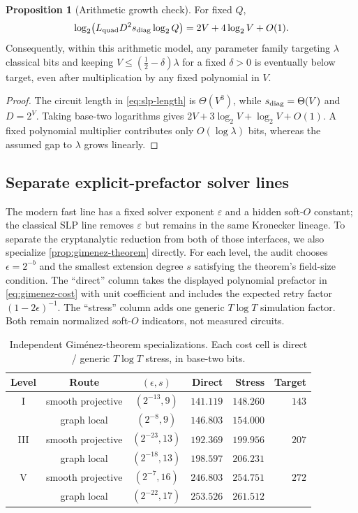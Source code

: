\documentclass[11pt,a4paper]{article}
\theoremstyle{definition}
\newtheorem{proposition}[theorem]{Proposition}
\theoremstyle{remark}
\begin{document}
\begin{proposition}[Arithmetic growth check]\label{prop:slp-growth}
For fixed $Q$,
\[
 \log_2\!\left(L_{\rm quad}D^2s_{\rm diag}\log_2Q\right)
 =2V+4\log_2V+O(1).
\]
Consequently, within this arithmetic model, any parameter family targeting $\lambda$ classical bits and keeping $V\le(\tfrac12-\delta)\lambda$ for a fixed $\delta>0$ is eventually below target, even after multiplication by any fixed polynomial in $V$.
\end{proposition}

\begin{proof}
The circuit length in \eqref{eq:slp-length} is $\Theta(V^3)$, while $s_{\rm diag}=\Theta(V)$ and $D=2^V$.  Taking base-two logarithms gives $2V+3\log_2V+\log_2V+O(1)$.  A fixed polynomial multiplier contributes only $O(\log\lambda)$ bits, whereas the assumed gap to $\lambda$ grows linearly.
\end{proof}

\subsection{Separate explicit-prefactor solver lines}\label{subsec:independent-cost}

The modern fast line has a fixed solver exponent $\varepsilon$ and a hidden soft-$O$ constant; the classical SLP line removes $\varepsilon$ but remains in the same Kronecker lineage.  To separate the cryptanalytic reduction from both of those interfaces, we also specialize \cref{prop:gimenez-theorem} directly.  For each level, the audit chooses $\epsilon=2^{-b}$ and the smallest extension degree $s$ satisfying the theorem's field-size condition.  The ``direct'' column takes the displayed polynomial prefactor in \eqref{eq:gimenez-cost} with unit coefficient and includes the expected retry factor $(1-2\epsilon)^{-1}$.  The ``stress'' column adds one generic $T\log T$ simulation factor.  Both remain normalized soft-$O$ indicators, not measured circuits.

\begin{table}[t]
\centering
\small
\caption{Independent Gim\'enez-theorem specializations.  Each cost cell is direct / generic $T\log T$ stress, in base-two bits.}
\label{tab:gimenez-costs}
\setlength{\tabcolsep}{4pt}
\begin{tabular}{@{}c c c r r r@{}}
\toprule
Level & Route & $(\epsilon,s)$ & Direct & Stress & Target\\
\midrule
I   & smooth projective & $(2^{-13},9)$ & $141.119$ & $148.260$ & $143$\\
    & graph local       & $(2^{-8},9)$  & $146.803$ & $154.000$ & \\
III & smooth projective & $(2^{-23},13)$& $192.369$ & $199.956$ & $207$\\
    & graph local       & $(2^{-18},13)$& $198.597$ & $206.231$ & \\
V   & smooth projective & $(2^{-7},16)$ & $246.803$ & $254.751$ & $272$\\
    & graph local       & $(2^{-22},17)$& $253.526$ & $261.512$ & \\
\bottomrule
\end{tabular}
\end{table}
\end{document}
